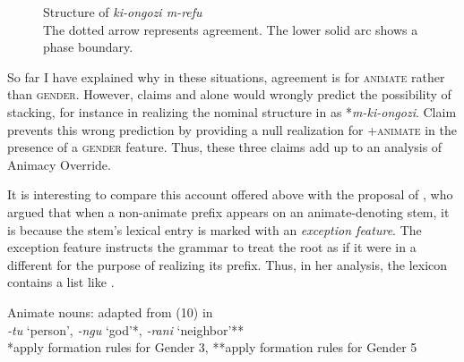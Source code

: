 \documentclass[output=paper,newtxmath,modfonts,nonflat,hidelinks]{langsci/langscibook}
\begin{document}
\begin{figure}[htbp]
\begin{center}

\caption{Structure of \textit{ki-ongozi m-refu} \\ The dotted arrow represents agreement. The lower solid arc shows a phase boundary.}
\label{ex:pesetsky:towerofanimacy}

\end{center}
\end{figure}


So far I have explained why in these situations, agreement is for \textsc{animate} rather than \textsc{gender}.  However, claims  and  alone would wrongly predict the possibility of  stacking, for instance in realizing the nominal structure in   as  *\textit{m-ki-ongozi}.  Claim  prevents this wrong prediction by providing a null realization for +\textsc{animate} in the presence of a \textsc{gender} feature. Thus, these three claims add up to an analysis of Animacy Override. 
 
It is interesting to compare this account offered above with the proposal of \citet{carstens91}, who argued that when a non-animate prefix appears on an animate-denoting stem, it is because the stem's lexical entry is marked with an \textit{exception feature}.  The exception feature instructs the grammar to treat the root as if it were in a different  for the purpose of realizing its  prefix. Thus, in her analysis, the lexicon contains a list like .
 
\ea\label{ex:pesetsky:carstinianlist} Animate nouns: \hfill adapted from (10) in \citet{carstens91} \\ \textit{-tu} `person', \textit{-ngu}  `god'*,   \textit{-rani}   `neighbor'** \\ *apply formation rules for Gender 3, **apply formation rules for Gender 5 \\  \z 
\end{document}
